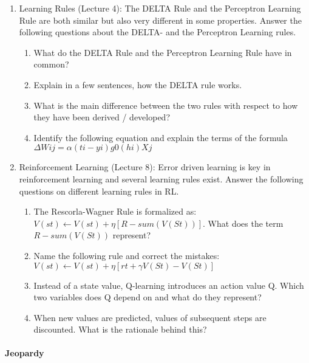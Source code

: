 \documentclass[main]{subfiles}
\begin{document}
\begin{enumerate}
    \item Learning Rules (Lecture 4):
    The DELTA Rule and the Perceptron Learning Rule are both similar but also very different in some properties. Answer the following questions about the DELTA- and the Perceptron Learning rules.
  \begin{enumerate}[label*=\arabic*.]
    \item What do the DELTA Rule and the Perceptron Learning Rule have in common?
    \item Explain in a few sentences, how the DELTA rule works.
    \item What is the main difference between the two rules with respect to how they have been derived / developed?
    \item Identify the following equation and explain the terms of the formula $\Delta W ij = α(t i − y i )g 0 (h i )X j$
  \end{enumerate}

    \item Reinforcement Learning (Lecture 8):
    Error driven learning is key in reinforcement learning and several learning rules exist. Answer the following questions on different learning rules in RL.
  \begin{enumerate}[label*=\arabic*.]
    \item The Rescorla-Wagner Rule is formalized as: $V (s t ) \longleftarrow V (s t ) + \eta [R − sum(V (S t ))]$. What does the term $R − sum(V (S t ))$ represent?
    \item Name the following rule and correct the mistakes: $V (s t ) \longleftarrow V (s t ) + η[r t + \gamma V (S t ) − V (S t )]$
    \item Instead of a state value, Q-learning introduces an action value Q. Which two variables does Q depend on and what do they represent?
    \item When new values are predicted, values of subsequent steps are discounted. What is the rationale behind this?  
  
  \end{enumerate}
\end{enumerate}

\paragraph{Jeopardy}
\end{document}
